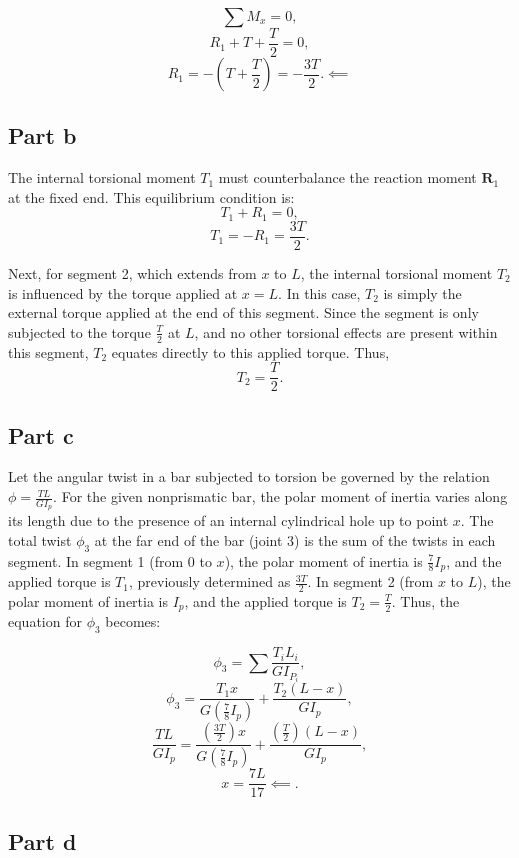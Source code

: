 \documentclass[12pt]{article}
\begin{document}
\[
\sum M_x = 0,
\]
\[
R_1 + T + \frac{T}{2} = 0,
\]
\[
R_1 = -\left(T + \frac{T}{2}\right) = -\frac{3T}{2}. \impliedby
\]
\AnswerTag

\subsection*{Part b}

The internal torsional moment \(T_1\) must counterbalance the reaction moment \(\mathbf{R}_1\) at the fixed end. This equilibrium condition is:
\[
T_1 + R_1 = 0,
\]
\[
T_1 =- R_1 = \frac{3T}{2}.
\]
\AnswerTag


Next, for segment 2, which extends from \(x\) to \(L\), the internal torsional moment \(T_2\) is influenced by the torque applied at \(x = L\). In this case, \(T_2\) is simply the external torque applied at the end of this segment. Since the segment is only subjected to the torque \(\frac{T}{2}\) at \(L\), and no other torsional effects are present within this segment, \(T_2\) equates directly to this applied torque. Thus,
\[
T_2 = \frac{T}{2}.
\]
\AnswerTag

\subsection*{Part c}

Let the angular twist in a bar subjected to torsion be governed by the relation \(\phi = \frac{TL}{GI_p}\). For the given nonprismatic bar, the polar moment of inertia varies along its length due to the presence of an internal cylindrical hole up to point \(x\). The total twist \(\phi_3\) at the far end of the bar (joint 3) is the sum of the twists in each segment. In segment 1 (from \(0\) to \(x\)), the polar moment of inertia is \(\frac{7}{8}I_p\), and the applied torque is \(T_1\), previously determined as \(\frac{3T}{2}\). In segment 2 (from \(x\) to \(L\)), the polar moment of inertia is \(I_p\), and the applied torque is \(T_2 = \frac{T}{2}\). Thus, the equation for \(\phi_3\) becomes:

\[\phi_3=\sum \frac{T_i L_i}{G I_{P_i}},\]
\[
\phi_3 = \frac{T_1 x}{G \left(\frac{7}{8}I_p\right)} + \frac{T_2 (L - x)}{G I_p},
\]
\[
\frac{TL}{GI_p} = \frac{\left(\frac{3T}{2}\right) x}{G \left(\frac{7}{8}I_p\right)} + \frac{\left(\frac{T}{2}\right) (L - x)}{G I_p},
\]
\[
x = \frac{7L}{17} \impliedby .
\]
\AnswerTag
\subsection*{Part d}
\end{document}
